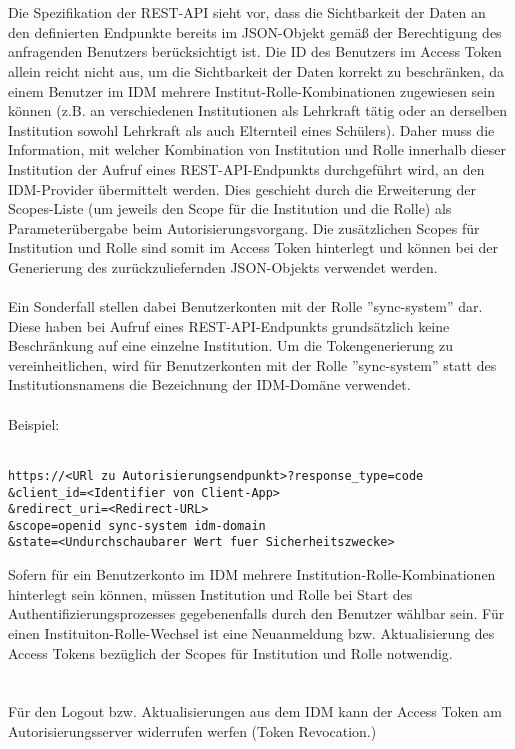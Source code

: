 \\
\\
Die Spezifikation der REST-API sieht vor, dass die Sichtbarkeit der Daten an den definierten Endpunkte bereits im JSON-Objekt gemäß der Berechtigung des anfragenden Benutzers berücksichtigt ist. 
Die ID des Benutzers im Access Token allein reicht nicht aus, um die Sichtbarkeit der Daten korrekt zu beschränken, da einem Benutzer im IDM mehrere Institut-Rolle-Kombinationen zugewiesen sein können (z.B. an verschiedenen Institutionen als Lehrkraft tätig oder an derselben Institution sowohl Lehrkraft als auch Elternteil eines Schülers). 
Daher muss die Information, mit welcher Kombination von Institution und Rolle innerhalb dieser Institution der Aufruf eines REST-API-Endpunkts durchgeführt wird, an den IDM-Provider übermittelt werden. 
Dies geschieht durch die Erweiterung der Scopes-Liste (um jeweils den Scope für die Institution und die Rolle) als Parameterübergabe beim Autorisierungsvorgang. 
Die zusätzlichen Scopes für Institution und Rolle sind somit im Access Token hinterlegt und können bei der Generierung des zurückzuliefernden JSON-Objekts verwendet werden. \\
\\
Ein Sonderfall stellen dabei Benutzerkonten mit der Rolle ''sync-system'' dar. 
Diese haben bei Aufruf eines REST-API-Endpunkts grundsätzlich keine Beschränkung auf eine einzelne Institution. 
Um die Tokengenerierung zu vereinheitlichen, wird für Benutzerkonten mit der Rolle ''sync-system'' statt des Institutionsnamens die Bezeichnung der IDM-Domäne verwendet.\\
\\
Beispiel:\\
\\
\begin{lstlisting}
https://<URl zu Autorisierungsendpunkt>?response_type=code
&client_id=<Identifier von Client-App>
&redirect_uri=<Redirect-URL>
&scope=openid sync-system idm-domain
&state=<Undurchschaubarer Wert fuer Sicherheitszwecke>
\end{lstlisting}

Sofern für ein Benutzerkonto im IDM mehrere Institution-Rolle-Kombinationen hinterlegt sein können, müssen Institution und Rolle bei Start des Authentifizierungsprozesses gegebenenfalls durch den Benutzer wählbar sein. 
Für einen Instituiton-Rolle-Wechsel ist eine Neuanmeldung bzw. Aktualisierung des Access Tokens bezüglich der Scopes für Institution und Rolle notwendig. \\
\\
\\
Für den Logout bzw. Aktualisierungen aus dem IDM kann der Access Token am Autorisierungsserver widerrufen werfen (Token Revocation.)